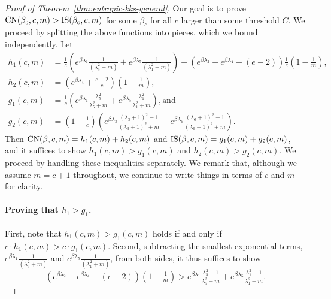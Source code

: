 \begin{proof}[Proof of Theorem~\ref{thm:entropic-kks-general}]
    Our goal is to prove $\textrm{CN}(\beta_c,c,m) > \textrm{IS}(\beta_c,c,m)$ for some $\beta_c$ for all $c$ larger than some threshold $C$.
    We proceed by splitting the above functions into pieces, which we bound independently.
    Let
    \begin{align*}
        h_1(c,m) &=  \tfrac{1}{c}\left(e^{\beta\lambda_1} \tfrac{1}{(\lambda_5^2 + m )}
                            + e^{\beta\lambda_5} \tfrac{1}{(\lambda_1^2 + m )}\right)
                  + \left(e^{\beta\lambda_2}-e^{\beta\lambda_4} - (e - 2) \right)\tfrac{1}{c}(1 - \tfrac{1}{m}), \\
        h_2(c,m) &= \left( e^{\beta \lambda_4} + \tfrac{e-2}{c}\right)(1-\tfrac{1}{m}), \\
        g_1(c,m) &= \tfrac{1}{c}\left( e^{\beta\lambda_1} \tfrac{\lambda_5^2}{\lambda_5^2 + m} + e^{\beta\lambda_5}\tfrac{\lambda_1^2}{\lambda_1^2+m} \right), \text{and} \\
        g_2(c,m) &= (1 - \tfrac{1}{c}) \left( e^{\beta\lambda_3} \tfrac{(\lambda_3+1)^2-1}{(\lambda_3+1)^2+m} + e^{\beta \lambda_6} \tfrac{(\lambda_6+1)^2-1}{(\lambda_6+1)^2+m} \right).
    \end{align*}
    Then $\textrm{CN}(\beta,c,m) = h_1(c,m) + h_2(c,m)$ and
    $\textrm{IS}(\beta,c,m) = g_1(c,m) + g_2(c,m)$, and it suffices to show
    $h_1(c,m) > g_1(c,m)$ and $h_2(c,m) > g_2(c,m)$.
    We proceed by handling these inequalities separately. We remark that, although we assume $m = c+1$ throughout, we continue to write things in terms of $c$ and $m$ for clarity.

\paragraph{Proving that $h_1 > g_1$.}
    First, note that $h_1(c,m) > g_1(c,m)$ holds if and only if $c\cdot h_1(c,m) > c \cdot g_1(c,m)$.
    Second, subtracting the smallest exponential terms, $e^{\beta\lambda_1} \tfrac{1}{(\lambda_5^2 + m )}$ and $e^{\beta\lambda_5} \tfrac{1}{(\lambda_1^2 + m )}$, from both sides, it thus suffices to show
    \begin{equation}\label{eqn:main-piece1}
      \left(e^{\beta\lambda_2}-e^{\beta\lambda_4} - (e - 2) \right)(1 - \tfrac{1}{m})
    > e^{\beta\lambda_1} \tfrac{\lambda_5^2 - 1}{\lambda_5^2 + m} + e^{\beta\lambda_5}\tfrac{\lambda_1^2 - 1}{\lambda_1^2+m}.
    \end{equation}


\end{proof}
